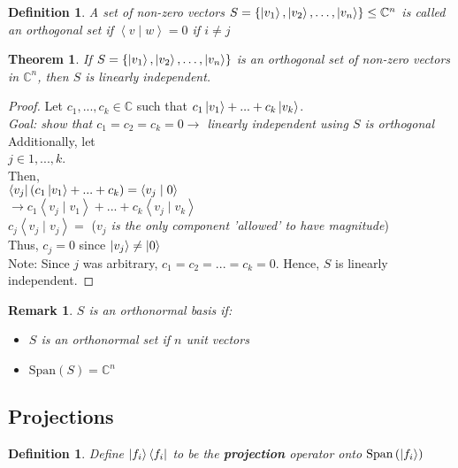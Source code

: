 \documentclass[12pt]{article}
\theoremstyle{plain}
\newtheorem{theorem}[lemma]{Theorem}
\theoremstyle{nonumberplain}
\theoremstyle{plain}
\newtheorem{definition}[lemma]{Definition}
\newtheorem{remark}[lemma]{Remark}
\theoremstyle{nonumberplain}
\newtheorem{proof}{Proof.}
\newcommand\1{{\bf 1}}
\newcommand{\C}{\mathbb{C}} %
\newcommand{\<}{\left\langle}
\renewcommand{\>}{\right\rangle}
\newcommand{\lp}{\left(}
\newcommand{\rp}{\right)}
\newcommand{\lb}{\left\{}
\newcommand{\rb}{\right\}}
\newcommand{\inp}[2]{\left\langle#1\mid #2\right\rangle} %
\newcommand{\spn}[1]{\text{Span}\lp #1\rp} %
\newcommand{\setofkets}[1]{\lb \ket{#1_1}, \ket{#1_2}, \ldots, \ket{#1_n}\rb} %
\begin{document}
\begin{definition}
A set of non-zero vectors $S=\setofkets{v}\leq\C^n$ is called an orthogonal set if $\inp{v}{w}=0$ if $i\neq j$
\end{definition}
\begin{theorem}
If $S=\setofkets{v}$ is an orthogonal set of non-zero vectors in $\C^n$, then $S$ is linearly independent.
\end{theorem}
\begin{proof}
Let $c_1, ..., c_k\in\C$ such that $c_1\ket{v_1}+...+c_k\ket{v_k}$. \\
\textit{Goal: show that $c_1=c_2=c_k=0\longrightarrow$ linearly independent using $S$ is orthogonal} \\
Additionally, let \\ 
\indent $j\in{1,...,k}$.\\
Then, \\ 
\indent $\bra{v_j}(c_1\ket{v_1}+...+c_k)=\inp{v_j}{0}$ \\
\indent $\longrightarrow c_1\inp{v_j}{v_1}+...+c_k\inp{v_j}{v_k}$ \\
\indent $c_j\inp{v_j}{v_j}=$ (\textit{$v_j$ is the only component 'allowed' to have magnitude}) \\
Thus, $c_j=0$ since $\ket{v_j}\neq\ket{0}$ \\
Note: Since $j$ was arbitrary, $c_1 = c_2 = ... = c_k = 0$. Hence, $S$ is linearly independent.
\end{proof}

\begin{remark}
$S$ is an orthonormal basis if:
\begin{itemize}
	\item $S$ is an orthonormal set if $n$ unit vectors
	\item $\spn{S}=\C^n$
\end{itemize}
\end{remark}


\subsection{Projections}

\begin{definition}
Define $\ket{f_i}\bra{f_i}$ to be the \textbf{projection} operator onto $\spn{\ket{f_i}}$
\end{definition}
\end{document}
